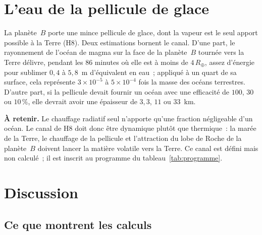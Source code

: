 \documentclass[11pt,a4paper]{article}
\newcommand{\Rt}{\ensuremath{R_\oplus}}
\begin{document}
\section{L'eau de la pellicule de glace}
\label{sec:eau}

La planète~$B$ porte une mince pellicule de glace, dont la vapeur est le seul apport possible à la Terre (H8). Deux estimations bornent le canal. D'une part, le rayonnement de l'océan de magma sur la face de la planète~$B$ tournée vers la Terre délivre, pendant les $86$ minutes où elle est à moins de $4\,\Rt$, assez d'énergie pour sublimer $0{,}4$ à $5{,}8$~m d'équivalent en eau~; appliqué à un quart de sa surface, cela représente $3\times10^{-5}$ à $5\times10^{-4}$ fois la masse des océans terrestres. D'autre part, si la pellicule devait fournir un océan avec une efficacité de $100$, $30$ ou $10\,\%$, elle devrait avoir une épaisseur de $3{,}3$, $11$ ou $33$~km.

\textbf{À retenir.} Le chauffage radiatif seul n'apporte qu'une fraction négligeable d'un océan. Le canal de H8 doit donc être dynamique plutôt que thermique~: la marée de la Terre, le chauffage de la pellicule et l'attraction du lobe de Roche de la planète~$B$ doivent lancer la matière volatile vers la Terre. Ce canal est défini mais non calculé~; il est inscrit au programme du tableau~\ref{tab:programme}.

\section{Discussion}
\label{sec:discussion}

\subsection{Ce que montrent les calculs}
\end{document}
